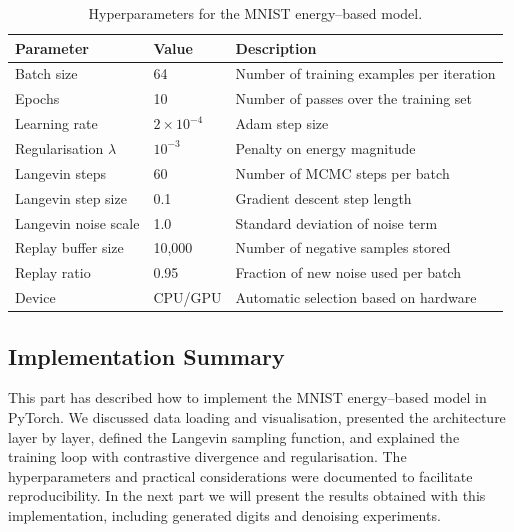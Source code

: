 \begin{table}[H]
    \centering
    \caption{Hyperparameters for the MNIST energy–based model.}
    \label{tab:hyperparams-ebm}
    \begin{tabular}{lll}
        \toprule
        Parameter & Value & Description \\
        \midrule
        Batch size & 64 & Number of training examples per iteration \\
        Epochs & 10 & Number of passes over the training set \\
        Learning rate & $2\times 10^{-4}$ & Adam step size \\
        Regularisation $\lambda$ & $10^{-3}$ & Penalty on energy magnitude \\
        Langevin steps & 60 & Number of MCMC steps per batch \\
        Langevin step size & 0.1 & Gradient descent step length \\
        Langevin noise scale & 1.0 & Standard deviation of noise term \\
        Replay buffer size & 10,000 & Number of negative samples stored \\
        Replay ratio & 0.95 & Fraction of new noise used per batch \\
        Device & CPU/GPU & Automatic selection based on hardware \\
        \bottomrule
    \end{tabular}
\end{table}

\subsection{Implementation Summary}

This part has described how to implement the MNIST energy–based model in
PyTorch.  We discussed data loading and visualisation, presented the
architecture layer by layer, defined the Langevin sampling function, and
explained the training loop with contrastive divergence and regularisation.
The hyperparameters and practical considerations were documented to
facilitate reproducibility.  In the next part we will present the results
obtained with this implementation, including generated digits and denoising
experiments.